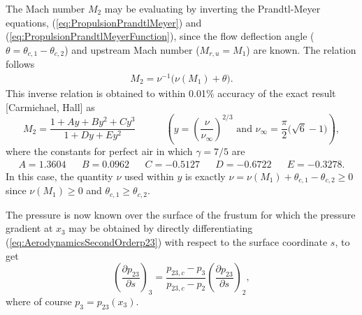 \documentclass[11pt,dvipsnames]{thesis}
\begin{document}
The Mach number $M_2$ may be evaluating by inverting the Prandtl-Meyer equations, (\ref{eq:PropulsionPrandtlMeyer}) and (\ref{eq:PropulsionPrandtlMeyerFunction}), since the flow deflection angle ($\theta = \theta_{c,1} - \theta_{c,2}$) and upstream Mach number ($M_{r,u} = M_1$) are known. The relation follows
\begin{align}
M_2 = \nu^{-1}\big(\nu(M_1) + \theta\big).
\end{align}
This inverse relation is obtained to within 0.01\% accuracy of the exact result [Carmichael, Hall] as
\begin{equation}
M_2 = \frac{1 + A y + B y^2 + C y^3}{1 + D y + E y^2} \qquad\quad \left(y = \left(\frac{\nu}{\nu_\infty}\right)^{\!2/3} \text{ and } \nu_\infty = \frac{\pi}{2}\big(\sqrt{6} - 1\big)\right),
\end{equation}
where the constants for perfect air in which $\gamma = 7/5$ are
\begin{align}
A = 1.3604 && B = 0.0962 && C = -0.5127 && D = -0.6722 && E = -0.3278.
\end{align}
In this case, the quantity $\nu$ used within $y$ is exactly $\nu = \nu(M_1) + \theta_{c,1} - \theta_{c,2} \geqslant 0$ since $\nu(M_1) \geqslant 0$ and $\theta_{c,1} \geqslant \theta_{c,2}$.



The pressure is now known over the surface of the frustum for which the pressure gradient at $x_3$ may be obtained by directly differentiating (\ref{eq:AerodynamicsSecondOrderp23}) with respect to the surface coordinate $s$, to get
\begin{equation}
\left(\frac{\partial p_{23}}{\partial s}\right)_{\!3} = \frac{p_{23,c} - p_3}{p_{23,c} - p_2} \left(\frac{\partial p_{23}}{\partial s}\right)_{\!2},
\end{equation}
where of course $p_3 = p_{23}(x_3)$.
\end{document}
